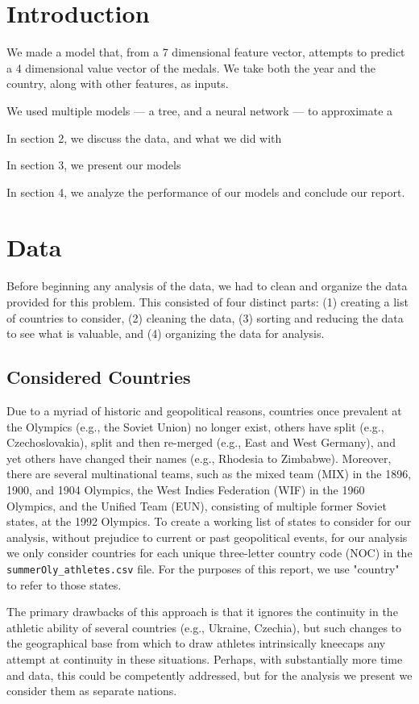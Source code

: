 \documentclass[12pt]{article}
\begin{document}
\section{Introduction}

We made a model that, from a 7 dimensional feature vector, attempts to predict a 4 dimensional value vector of the medals.
We take both the year and the country, along with other features, as inputs.

We used multiple models — a tree, and a neural network — to approximate a 

In section 2, we discuss the data, and what we did with 

In section 3, we present our models

In section 4, we analyze the performance of our models and conclude our report.

\section{Data}

Before beginning any analysis of the data, we had to clean and organize the data provided for this problem. 
This consisted of four distinct parts: (1) creating a list of countries to consider, (2) cleaning the data, (3) sorting and reducing the data to see what is valuable, and (4) organizing the data for analysis.

\subsection{Considered Countries}
Due to a myriad of historic and geopolitical reasons, countries once prevalent at the Olympics (e.g., the Soviet Union) no longer exist, others have split (e.g., Czechoslovakia), split and then re-merged (e.g., East and West Germany), and yet others have changed their names (e.g., Rhodesia to Zimbabwe). 
Moreover, there are several multinational teams, such as the mixed team (MIX) in the 1896, 1900, and 1904 Olympics, the West Indies Federation (WIF) in the 1960 Olympics, and the Unified Team (EUN), consisting of multiple former Soviet states, at the 1992 Olympics. 
To create a working list of states to consider for our analysis, without prejudice to current or past geopolitical events, for our analysis we only consider countries for each unique three-letter country code (NOC) in the \verb|summerOly_athletes.csv| file.
For the purposes of this report, we use "country" to refer to those states. 

The primary drawbacks of this approach is that it ignores the continuity in the athletic ability of several countries (e.g., Ukraine, Czechia), but such changes to the geographical base from which to draw athletes intrinsically kneecaps any attempt at continuity in these situations. 
Perhaps, with substantially more time and data, this could be competently addressed, but for the analysis we present we consider them as separate nations.
\end{document}
